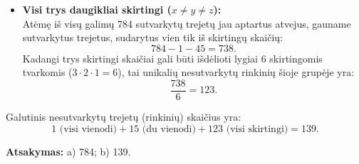 \documentclass[11pt,a4paper]{article}
\begin{document}
\begin{enumerate}
\begin{itemize}
        \item \textbf{Visi trys daugikliai skirtingi ($x \neq y \neq z$):} \\
        Atėmę iš visų galimų 784 sutvarkytų trejetų jau aptartus atvejus, gauname sutvarkytus trejetus, sudarytus vien tik iš skirtingų skaičių: 
        \[ 784 - 1 - 45 = 738. \]
        Kadangi trys skirtingi skaičiai gali būti išdėlioti lygiai $6$ skirtingomis tvarkomis ($3 \cdot 2 \cdot 1 = 6$), tai unikalių nesutvarkytų rinkinių šioje grupėje yra:
        \[ \frac{738}{6}  = 123. \]
    \end{itemize}
    
    Galutinis nesutvarkytų trejetų (rinkinių) skaičius yra:
    \[ 1 \text{ (visi vienodi)} + 15 \text{ (du vienodi)} + 123 \text{ (visi skirtingi)} = 139. \]
    
    \textbf{Atsakymas:} a) 784; \quad b) 139.
\end{enumerate}
\end{document}

